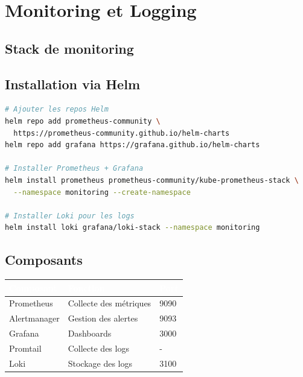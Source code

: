 \documentclass[12pt,a4paper]{article}
\begin{document}
\newpage

\section{Monitoring et Logging}

\subsection{Stack de monitoring}

\begin{center}
    \fbox{}
\end{center}

\subsection{Installation via Helm}

\begin{lstlisting}[language=bash,caption={Installation Prometheus + Grafana + Loki}]
# Ajouter les repos Helm
helm repo add prometheus-community \
  https://prometheus-community.github.io/helm-charts
helm repo add grafana https://grafana.github.io/helm-charts

# Installer Prometheus + Grafana
helm install prometheus prometheus-community/kube-prometheus-stack \
  --namespace monitoring --create-namespace

# Installer Loki pour les logs
helm install loki grafana/loki-stack --namespace monitoring
\end{lstlisting}

\subsection{Composants}

\begin{center}
\begin{tabular}{|l|l|l|}
\hline
\rowcolor{primary}
\textcolor{white}{\textbf{Composant}} & \textcolor{white}{\textbf{Fonction}} & \textcolor{white}{\textbf{Port}} \\
\hline
Prometheus & Collecte des métriques & 9090 \\
Alertmanager & Gestion des alertes & 9093 \\
Grafana & Dashboards & 3000 \\
Promtail & Collecte des logs & - \\
Loki & Stockage des logs & 3100 \\
\hline
\end{tabular}
\end{center}
\end{document}
